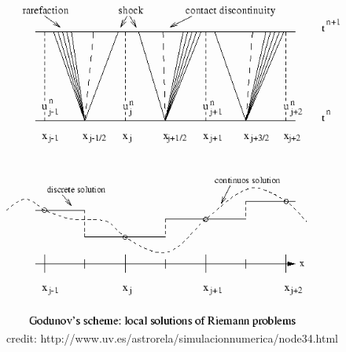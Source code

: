 \begin{frame}



\begin{figure}
\includegraphics[width=.65\columnwidth]{images/godunov}
\caption{credit: http://www.uv.es/astrorela/simulacionnumerica/node34.html}
\end{figure}


\end{frame}

